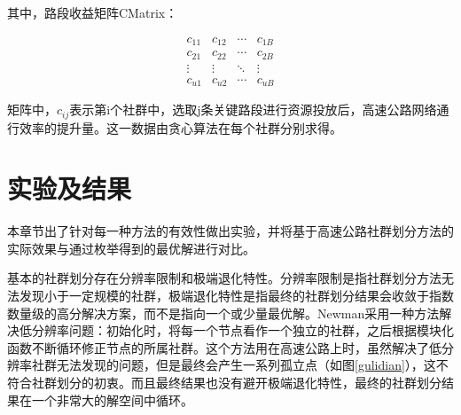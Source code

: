 		    	其中，路段收益矩阵CMatrix：

				\[\begin{array}{*{20}{c}}
				  {{c_{11}}}&{{c_{12}}}& \cdots &{{c_{1B}}} \\ 
				  {{c_{21}}}&{{c_{22}}}& \cdots &{{c_{2B}}} \\ 
				   \vdots & \vdots & \ddots & \vdots  \\ 
				  {{c_{u1}}}&{{c_{u2}}}& \cdots &{{c_{uB}}} 
				\end{array}\]
				
				矩阵中，$c_{ij}$表示第i个社群中，选取j条关键路段进行资源投放后，高速公路网络通行效率的提升量。这一数据由贪心算法在每个社群分别求得。

	\section{实验及结果}
		本章节出了针对每一种方法的有效性做出实验，并将基于高速公路社群划分方法的实际效果与通过枚举得到的最优解进行对比。

		基本的社群划分存在分辨率限制和极端退化特性。分辨率限制是指社群划分方法无法发现小于一定规模的社群，极端退化特性是指最终的社群划分结果会收敛于指数数量级的高分解决方案，而不是指向一个或少量最优解。Newman\parencite{NewmanFast}采用一种方法解决低分辨率问题：初始化时，将每一个节点看作一个独立的社群，之后根据模块化函数不断循环修正节点的所属社群。这个方法用在高速公路上时，虽然解决了低分辨率社群无法发现的问题，但是最终会产生一系列孤立点（如图\ref{gulidian}），这不符合社群划分的初衷。而且最终结果也没有避开极端退化特性，最终的社群划分结果在一个非常大的解空间中循环。

